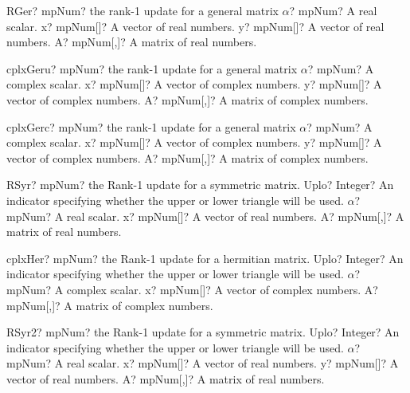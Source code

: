 \documentclass[12pt,a4paper,openany]{book}
\begin{document}
\begin{mpFunctionsExtract}
\mpFunctionFour
{RGer? mpNum? the rank-1 update for a general matrix}
{$\alpha$? mpNum? A real scalar.}
{x? mpNum[]? A vector of real numbers.}
{y? mpNum[]? A vector of real numbers.}
{A? mpNum[,]? A matrix of real numbers.}
\end{mpFunctionsExtract}

\begin{mpFunctionsExtract}
\mpFunctionFour
{cplxGeru? mpNum? the rank-1 update for a general matrix}
{$\alpha$? mpNum? A complex scalar.}
{x? mpNum[]? A vector of complex numbers.}
{y? mpNum[]? A vector of complex numbers.}
{A? mpNum[,]? A matrix of complex numbers.}
\end{mpFunctionsExtract}

\begin{mpFunctionsExtract}
\mpFunctionFour
{cplxGerc? mpNum? the rank-1 update for a general matrix}
{$\alpha$? mpNum? A complex scalar.}
{x? mpNum[]? A vector of complex numbers.}
{y? mpNum[]? A vector of complex numbers.}
{A? mpNum[,]? A matrix of complex numbers.}
\end{mpFunctionsExtract}

\begin{mpFunctionsExtract}
\mpFunctionFour
{RSyr? mpNum? the Rank-1 update for a symmetric matrix.}
{Uplo? Integer? An indicator specifying whether the upper or lower triangle will be used.}
{$\alpha$? mpNum? A real scalar.}
{x? mpNum[]? A vector of real numbers.}
{A? mpNum[,]? A matrix of real numbers.}
\end{mpFunctionsExtract}

\begin{mpFunctionsExtract}
\mpFunctionFour
{cplxHer? mpNum? the Rank-1 update for a hermitian matrix.}
{Uplo? Integer? An indicator specifying whether the upper or lower triangle will be used.}
{$\alpha$? mpNum? A complex scalar.}
{x? mpNum[]? A vector of complex numbers.}
{A? mpNum[,]? A matrix of complex numbers.}
\end{mpFunctionsExtract}

\begin{mpFunctionsExtract}
\mpFunctionFive
{RSyr2? mpNum? the Rank-1 update for a symmetric matrix.}
{Uplo? Integer? An indicator specifying whether the upper or lower triangle will be used.}
{$\alpha$? mpNum? A real scalar.}
{x? mpNum[]? A vector of real numbers.}
{y? mpNum[]? A vector of real numbers.}
{A? mpNum[,]? A matrix of real numbers.}
\end{mpFunctionsExtract}
\end{document}
